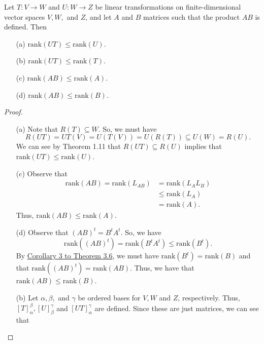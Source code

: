 \begin{theorem}
    Let \( T: V \to W  \) and \( U: W \to Z  \) be linear transformations on finite-dimensional vector spaces \( V,W,  \) and \( Z  \), and let \( A  \) and \( B  \) matrices such that the product \( AB  \) is defined. Then
    \begin{enumerate}
        \item[(a)] \( \text{rank}(UT) \leq \text{rank}(U) \).
        \item[(b)] \( \text{rank}(UT) \leq \text{rank}(T) \).
        \item[(c)] \( \text{rank}(AB) \leq \text{rank}(A) \).
        \item[(d)] \( \text{rank}(AB) \leq \text{rank}(B) \).
    \end{enumerate}
\end{theorem}
\begin{proof}
\begin{enumerate}
    \item[(a)] Note that \( R(T) \subseteq W  \). So, we must have
        \[  R(UT) = UT(V) = U(T(V)) = U(R(T)) \subseteq U(W) = R(U). \]
        We can see by Theorem 1.11 that \( R(UT) \subseteq R(U)  \) implies that  \( \text{rank}(UT) \leq \text{rank}(U) \).
    \item[(c)] Observe that
        \begin{align*}
            \text{rank}(AB) = \text{rank}({L}_{AB}) &= \text{rank}({L}_{A} {L}_{B}) \\
                                                    &\leq  \text{rank}({L}_{A}) \tag{By part (a)} \\
                                                    &= \text{rank}(A).
        \end{align*}
        Thus, \( \text{rank}(AB) \leq \text{rank}(A) \).
    \item[(d)] Observe that \( (AB)^{t} = B^{t} A^{t} \). So, we have
        \[  \text{rank}((AB)^{t}) = \text{rank}(B^{t} A^{t}) \leq \text{rank}(B^{t}). \]
By {\hyperref[Corollary 3 to Theorem 3.6]{Corollary 3 to Theorem 3.6}}, we must have \( \text{rank}(B^{t}) = \text{rank}(B) \) and that \( \text{rank}((AB)^{t}) = \text{rank}(AB) \). Thus, we have that \( \text{rank}(AB) \leq \text{rank}(B) \).
    \item[(b)] Let \( \alpha, \beta,  \) and \( \gamma \) be ordered bases for \( V, W  \) and \( Z  \), respectively. Thus, \( [T]_{\alpha}^{\beta}, [U]_{\beta}^{\gamma} \) and \( [UT]_{\alpha}^{\gamma}   \) are defined. Since these are just matrices, we can see that

\end{enumerate}
\end{proof}
